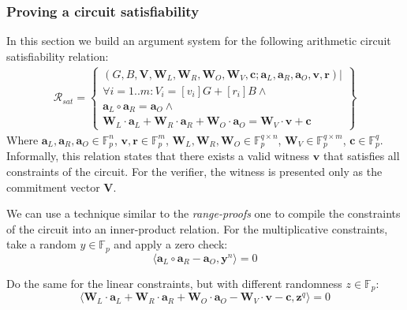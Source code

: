 \documentclass[../lecture-notes-148x210.tex]{subfiles}
\begin{document}
\subsubsection{Proving a circuit satisfiability}
In this section we build an argument system for the following arithmetic circuit satisfiability relation:
\begin{equation}
    \begin{aligned}
        \mathcal{R}_{sat} = \left\{
            \begin{array}{l} 
                (G, B, \mathbf{V}, \mathbf{W}_L, \mathbf{W}_R, \mathbf{W}_O, \mathbf{W}_V, \mathbf{c}; \mathbf{a}_L, \mathbf{a}_R, \mathbf{a}_O, \mathbf{v}, \mathbf{r}) | \\ 
                \forall i=1..m: V_i = [v_i]G + [r_i]B \wedge \\
                \mathbf{a}_L \circ \mathbf{a}_R = \mathbf{a}_O \wedge \\
                \mathbf{W}_L \cdot \mathbf{a}_L + \mathbf{W}_R \cdot \mathbf{a}_R + \mathbf{W}_O \cdot \mathbf{a}_O = \mathbf{W}_V \cdot \mathbf{v} + \mathbf{c}
        \end{array}\right\}
    \end{aligned}
\end{equation}
Where $\mathbf{a}_L, \mathbf{a}_R, \mathbf{a}_O \in \mathbb{F}_p^n$, $\mathbf{v}, \mathbf{r} \in \mathbb{F}_p^m$, $\mathbf{W}_L, \mathbf{W}_R, \mathbf{W}_O \in \mathbb{F}_p^{q \times n}$, $\mathbf{W}_V \in \mathbb{F}_p^{q \times m}$, $\mathbf{c} \in \mathbb{F}_p^q$.
Informally, this relation states that there exists a valid witness $\mathbf{v}$ that satisfies all constraints of the circuit. For the verifier, the witness is presented only as the commitment vector $\mathbf{V}$.

We can use a technique similar to the \textit{range-proofs} one to compile the constraints of the circuit into an inner-product relation. For the multiplicative constraints, take a random $y \in \mathbb{F}_p$ and apply a zero check:
$$ \langle \mathbf{a}_L \circ \mathbf{a}_R - \mathbf{a}_O, \mathbf{y}^n \rangle = 0$$

Do the same for the linear constraints, but with different randomness $z \in \mathbb{F}_p$:
$$ \langle \mathbf{W}_L \cdot \mathbf{a}_L + \mathbf{W}_R \cdot \mathbf{a}_R + \mathbf{W}_O \cdot \mathbf{a}_O - \mathbf{W}_V \cdot \mathbf{v} - \mathbf{c}, \mathbf{z}^q \rangle = 0$$
\end{document}

